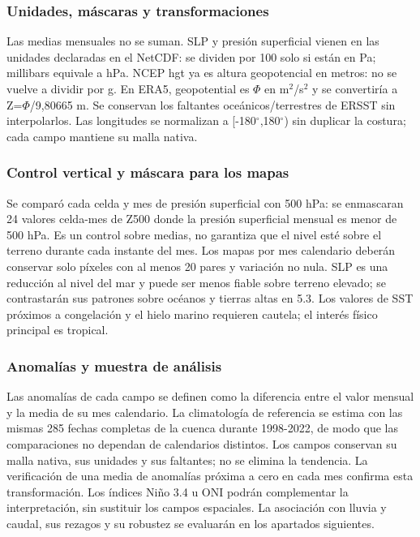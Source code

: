 \documentclass[10pt,a4paper]{article}
\begin{document}
\subsubsection*{Unidades, máscaras y transformaciones}
Las medias mensuales no se suman. SLP y presión superficial vienen en las unidades declaradas en el NetCDF: se dividen por 100 solo si están en Pa; millibars equivale a hPa. NCEP hgt ya es altura geopotencial en metros: no se vuelve a dividir por g. En ERA5, geopotential es $\Phi$ en m$^2$/s$^2$ y se convertiría a Z=$\Phi$/9,80665 m. Se conservan los faltantes oceánicos/terrestres de ERSST sin interpolarlos. Las longitudes se normalizan a [-180$^\circ$,180$^\circ$) sin duplicar la costura; cada campo mantiene su malla nativa.

\subsubsection*{Control vertical y máscara para los mapas}
Se comparó cada celda y mes de presión superficial con 500 hPa: se enmascaran 24 valores celda-mes de Z500 donde la presión superficial mensual es menor de 500 hPa. Es un control sobre medias, no garantiza que el nivel esté sobre el terreno durante cada instante del mes. Los mapas por mes calendario deberán conservar solo píxeles con al menos 20 pares y variación no nula. SLP es una reducción al nivel del mar y puede ser menos fiable sobre terreno elevado; se contrastarán sus patrones sobre océanos y tierras altas en 5.3. Los valores de SST próximos a congelación y el hielo marino requieren cautela; el interés físico principal es tropical.

\subsubsection*{Anomalías y muestra de análisis}
Las anomalías de cada campo se definen como la diferencia entre el valor mensual y la media de su mes calendario. La climatología de referencia se estima con las mismas 285 fechas completas de la cuenca durante 1998-2022, de modo que las comparaciones no dependan de calendarios distintos. Los campos conservan su malla nativa, sus unidades y sus faltantes; no se elimina la tendencia. La verificación de una media de anomalías próxima a cero en cada mes confirma esta transformación. Los índices Niño 3.4 u ONI podrán complementar la interpretación, sin sustituir los campos espaciales. La asociación con lluvia y caudal, sus rezagos y su robustez se evaluarán en los apartados siguientes.
\end{document}
